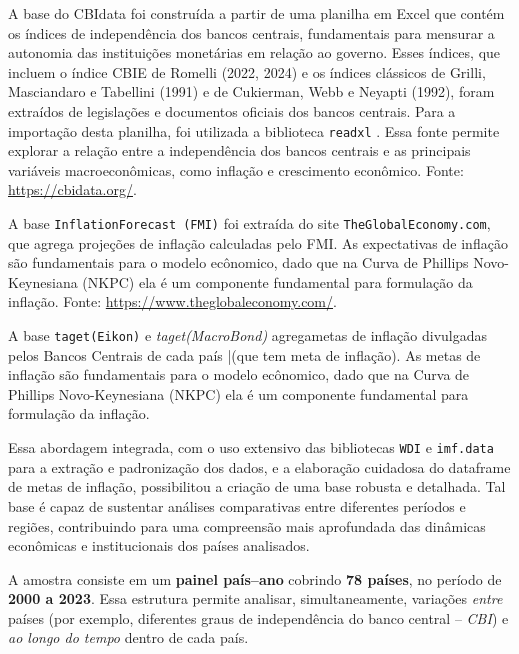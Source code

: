 \documentclass[a4paper,12pt]{article}
\begin{document}
A base do CBIdata foi construída a partir de uma planilha em Excel que contém os índices de independência dos bancos centrais, fundamentais para mensurar a autonomia das instituições monetárias em relação ao governo. Esses índices, que incluem o índice CBIE de Romelli (2022, 2024) e os índices clássicos de Grilli, Masciandaro e Tabellini (1991) e de Cukierman, Webb e Neyapti (1992), foram extraídos de legislações e documentos oficiais dos bancos centrais. Para a importação desta planilha, foi utilizada a biblioteca \texttt{readxl} \cite{readxl}. Essa fonte permite explorar a relação entre a independência dos bancos centrais e as principais variáveis macroeconômicas, como inflação e crescimento econômico. Fonte: \url{https://cbidata.org/}.

A base \texttt{InflationForecast (FMI)} foi extraída do site \texttt{TheGlobalEconomy.com}, que agrega projeções de inflação calculadas pelo FMI. As expectativas de inflação são fundamentais para o modelo ecônomico, dado que na Curva de Phillips Novo-Keynesiana (NKPC) ela é um componente fundamental para formulação da inflação. Fonte: \url{https://www.theglobaleconomy.com/}. 

A base \texttt{taget(Eikon)} e \textit{taget(MacroBond)} agregametas de inflação divulgadas pelos Bancos Centrais de cada país |(que tem meta de inflação). As metas de inflação são fundamentais para o modelo ecônomico, dado que na Curva de Phillips Novo-Keynesiana (NKPC) ela é um componente fundamental para formulação da inflação. 

Essa abordagem integrada, com o uso extensivo das bibliotecas \texttt{WDI} \cite{WDI} e \texttt{imf.data} \cite{imf.data} para a extração e padronização dos dados, e a elaboração cuidadosa do dataframe de metas de inflação, possibilitou a criação de uma base robusta e detalhada. Tal base é capaz de sustentar análises comparativas entre diferentes períodos e regiões, contribuindo para uma compreensão mais aprofundada das dinâmicas econômicas e institucionais dos países analisados.

A amostra consiste em um \textbf{painel país–ano} cobrindo \textbf{78 países}, no período de \textbf{2000 a 2023}. Essa estrutura permite analisar, simultaneamente, variações \emph{entre} países (por exemplo, diferentes graus de independência do banco central – \emph{CBI}) e \emph{ao longo do tempo} dentro de cada país.
\end{document}
